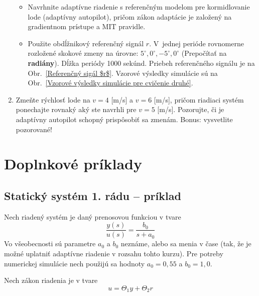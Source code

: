 \documentclass[a4paper, 10pt, ]{article}
\begin{document}
\begin{enumerate}
	\begin{itemize}
		\item Navrhnite adaptívne riadenie s referenčným modelom pre kormidlovanie lode (adaptívny autopilot), pričom zákon adaptácie je založený na gradientnom prístupe a MIT pravidle.

		\item Použite obdĺžnikový referenčný signál $r$. V~jednej perióde rovnomerne rozložené skokové zmeny na úrovne: $5^\circ,0^\circ,-5^\circ,0^\circ$ (Prepočítať na \textbf{radiány}). Dĺžka periódy 1000 sekúnd. Priebeh referenčného signálu je na Obr.~\ref{Referenčný sigál $r$}. Vzorové výsledky simulácie sú na Obr.~\ref{Vzorové výsledky simulácie pre cvičenie druhé}.
	\end{itemize}


	\item Zmeňte rýchlosť lode na $v=4$ [m/s] a $v=6$ [m/s], pričom riadiaci systém ponechajte rovnaký aký ste navrhli pre $v=5$ [m/s]. Pozorujte, či je adaptívny autopilot schopný prispôsobiť sa zmenám. Bonus: vysvetlite pozorované!

\end{enumerate}












\section{Doplnkové príklady}


\subsection{Statický systém 1. rádu -- príklad}

Nech riadený systém je daný prenosovou funkciou v tvare
\begin{equation}
    \frac{y(s)}{u(s)} = \frac{b_0}{s+a_0}
\end{equation}
Vo všeobecnosti sú parametre $a_0$ a $b_0$ neznáme, alebo sa menia v čase (tak, že je možné uplatniť adaptívne riadenie v rozsahu tohto kurzu). Pre potreby numerickej simulácie nech použijú sa hodnoty $a_0 = 0,55$ a $b_0 = 1,0$.

Nech zákon riadenia je v tvare
\begin{equation}
    u = \Theta_1 y + \Theta_2 r
\end{equation}
\end{document}
